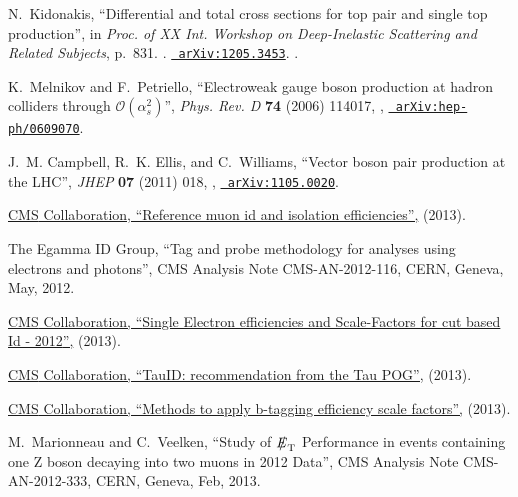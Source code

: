 \documentclass[12pt]{thesis}  %
\def\eslash{\ensuremath{{\hbox{$E$\kern-0.6em\lower-.05ex\hbox{/}\kern0.10em}}}}
\def\met{\mbox{$\eslash_\text{T}$}\xspace} %
\begin{document}
\begin{thebibliography}{100}
\hrefCMSnoop {} {N.~Kidonakis, ``{Differential and total cross sections for top
  pair and single top production}'',} in \textit{ Proc. of {XX} Int. Workshop
  on Deep-Inelastic Scattering and Related Subjects}, p.~831.
.
\newblock \href{http://www.arXiv.org/abs/1205.3453}{\texttt{ arXiv:1205.3453}}.
\newblock
\href{http://dx.doi.org/10.3204/DESY-PROC-2012-02/251}{}.

\hrefCMSnoop {} {K.~Melnikov and F.~Petriello, ``Electroweak gauge boson
  production at hadron colliders through $\mathcal{O}(\alpha_{s}^2)$'',}
  \textit{ Phys. Rev. D} \textbf{ 74} (2006) 114017,
  \href{http://dx.doi.org/10.1103/PhysRevD.74.114017}{},
  \href{http://www.arXiv.org/abs/hep-ph/0609070}{\texttt{
  arXiv:hep-ph/0609070}}.

\hrefCMSnoop {} {J.~M. Campbell, R.~K. Ellis, and C.~Williams, ``Vector boson
  pair production at the {LHC}'',} \textit{ JHEP} \textbf{ 07} (2011) 018,
  \href{http://dx.doi.org/10.1007/JHEP07(2011)018}{},
  \href{http://www.arXiv.org/abs/1105.0020}{\texttt{ arXiv:1105.0020}}.

\href {https://twiki.cern.ch/twiki/bin/viewauth/CMS/MuonReferenceEffs} {{ CMS}
  Collaboration, ``Reference muon id and isolation efficiencies'',} (2013).

\hrefCMSnoop {} {{The Egamma ID Group}, ``Tag and probe methodology for
  analyses using electrons and photons'',} CMS Analysis Note CMS-AN-2012-116,
  CERN, Geneva, May, 2012.

\href {https://twiki.cern.ch/twiki/bin/view/Main/EGammaScaleFactors2012} {{
  CMS} Collaboration, ``{Single Electron efficiencies and Scale-Factors for cut
  based Id - 2012}'',} (2013).

\href {https://twiki.cern.ch/twiki/bin/viewauth/CMS/TauIDRecommendation} {{
  CMS} Collaboration, ``TauID: recommendation from the Tau POG'',} (2013).

\href {https://twiki.cern.ch/twiki/bin/viewauth/CMS/BTagSFMethods} {{ CMS}
  Collaboration, ``Methods to apply b-tagging efficiency scale factors'',}
  (2013).

\hrefCMSnoop {} {M.~Marionneau and C.~Veelken, ``Study of \met Performance in
  events containing one Z boson decaying into two muons in 2012 Data'',} CMS
  Analysis Note CMS-AN-2012-333, CERN, Geneva, Feb, 2013.


\end{thebibliography}
\end{document}
